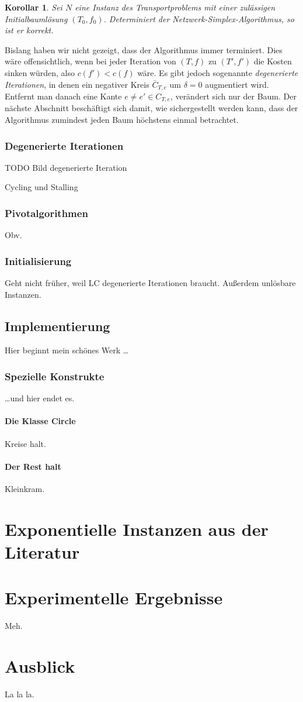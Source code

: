 \documentclass[a4paper,twoside,ngerman]{report}
\theoremstyle{plain}
\newtheorem{kor}[thm]{Korollar}
\theoremstyle{definition}
\begin{document}
\begin{kor}Sei $N$ eine Instanz des Transportproblems mit einer zulässigen Initialbaumlösung $(T_0,f_0)$. Determiniert der Netzwerk-Simplex-Algorithmus, so ist er korrekt.\end{kor}

Bislang haben wir nicht gezeigt, dass der Algorithmus immer terminiert. Dies wäre offensichtlich, wenn bei jeder Iteration von $(T,f)$ zu $(T',f')$ die Kosten sinken würden, also $c(f')<c(f)$ wäre. Es gibt jedoch sogenannte \emph{degenerierte Iterationen}, in denen ein negativer Kreis $\bar{C}_{T,e}$ um $\delta=0$ augmentiert wird. Entfernt man danach eine Kante $e\neq e'\in C_{T,e}$, verändert sich nur der Baum. Der nächste Abschnitt beschäftigt sich damit, wie sichergestellt werden kann, dass der Algorithmus zumindest jeden Baum höchstens einmal betrachtet.

\subsection{Degenerierte Iterationen}\label{deg}
TODO Bild degenerierte Iteration

Cycling und Stalling

\subsection{Pivotalgorithmen}\label{pivot}
Obv.

\subsection{Initialisierung} \label{init}
Geht nicht früher, weil LC degenerierte Iterationen braucht.
Außerdem unlösbare Instanzen.

\section{Implementierung} \label{prog}
Hier beginnt mein schönes Werk \ldots

\subsection{Spezielle Konstrukte}
\ldots und hier endet es.

\subsubsection{Die Klasse Circle}
Kreise halt.\cite{NSAbook}

\subsubsection{Der Rest halt}
Kleinkram.

\newpage
\chapter{Exponentielle Instanzen aus der Literatur}

\newpage
\chapter{Experimentelle Ergebnisse}
Meh.

\newpage
\chapter{Ausblick}
La la la.

{}

\end{document}
